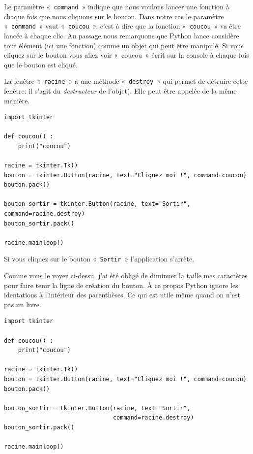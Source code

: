 Le paramètre «~\texttt{command}~» indique que nous voulons lancer une fonction à chaque fois que nous cliquons sur le bouton. Dans notre cas le paramètre «~\texttt{command}~» vaut «~\texttt{coucou}~», c'est à dire que la fonction «~\texttt{coucou}~» va être lancée à chaque clic. Au passage nous remarquons que Python lance considère tout élément (ici une fonction) comme un objet qui peut être manipulé. Si vous cliquez sur le bouton vous allez voir «~coucou~»  écrit sur la console à chaque fois que le bouton est cliqué.


La fenètre «~\texttt{racine}~» a une méthode «~\texttt{destroy}~» qui permet de détruire cette fenètre: il s'agit du \emph{destructeur} de l'objet). Elle peut être appelée de la même manière.

\begin{small}
\begin{Verbatim}[frame=single,rulecolor=\color{mbleu}, label=à taper]
import tkinter

def coucou() :
    print("coucou")

racine = tkinter.Tk()
bouton = tkinter.Button(racine, text="Cliquez moi !", command=coucou)
bouton.pack()

bouton_sortir = tkinter.Button(racine, text="Sortir", command=racine.destroy)
bouton_sortir.pack()

racine.mainloop()
\end{Verbatim}
\end{small}

Si vous cliquez sur le bouton «~\texttt{Sortir}~» l'application s'arrète.

Comme vous le voyez ci-dessu, j'ai été obligé de diminuer la taille mes caractères pour faire tenir la ligne de création du bouton. À ce propos Python ignore les identations à l'intérieur des parenthèses. Ce qui est utile même quand on n'est pas un livre. 

\begin{Verbatim}[frame=single,rulecolor=\color{gray}, label=ne pas saisir]
import tkinter

def coucou() :
    print("coucou")

racine = tkinter.Tk()
bouton = tkinter.Button(racine, text="Cliquez moi !", command=coucou)
bouton.pack()

bouton_sortir = tkinter.Button(racine, text="Sortir",
                               command=racine.destroy)
bouton_sortir.pack()

racine.mainloop()
\end{Verbatim}
 


